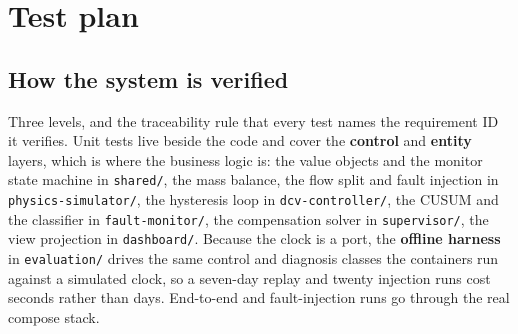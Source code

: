 \section{Test plan}\label{sec:10}

\subsection{How the system is verified}\label{sec:10.1}

Three levels, and the traceability rule that every test names the requirement ID it verifies.
Unit tests live beside the code and cover the \textbf{control} and \textbf{entity} layers, which is
where the business logic is: the value objects and the monitor state machine in \texttt{shared/},
the mass balance, the flow split and fault injection in \texttt{physics-simulator/}, the hysteresis
loop in \texttt{dcv-controller/}, the CUSUM and the classifier in \texttt{fault-monitor/}, the
compensation solver in \texttt{supervisor/}, the view projection in \texttt{dashboard/}. Because
the clock is a port, the \textbf{offline harness} in \texttt{evaluation/} drives the
same control and diagnosis classes the containers run against a simulated clock, so a seven-day
replay and twenty injection runs cost seconds rather than days. End-to-end and fault-injection runs
go through the real compose stack.

